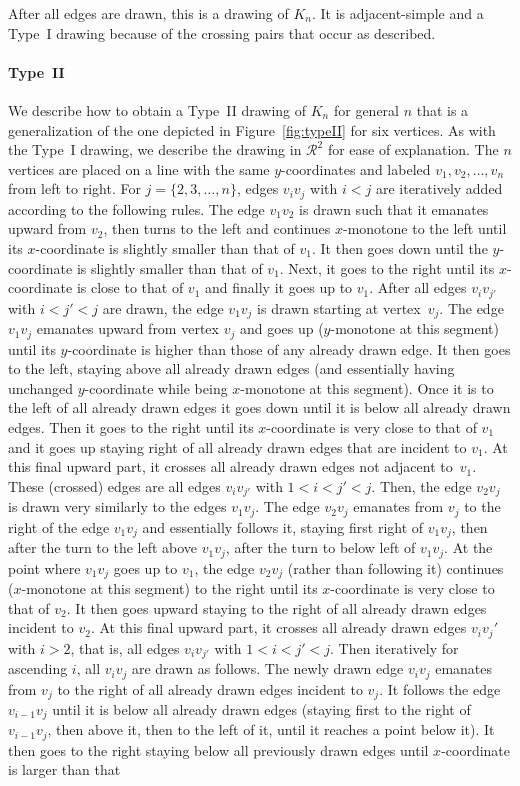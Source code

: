 \documentclass[a4paper,UKenglish,cleveref, autoref, thm-restate]{lipics_arxiv}
\begin{document}
   After all edges are drawn, this is a drawing of $K_n$. It is adjacent-simple and a Type~I drawing because of the crossing pairs that occur as described. 

\paragraph*{Type~II}
 We describe how to obtain a Type~II drawing of $K_n$ for general $n$ that is a generalization of the one depicted in Figure~\ref{fig:typeII} for six vertices. As with the Type~I drawing, we describe the drawing in $\mathcal{R}^2$ for ease of explanation. 
 The $n$ vertices are placed on a line with the same $y$-coordinates and labeled $v_1,v_2,\ldots,v_n$ from left to right.
 For $j=\{2,3,\ldots,n\}$, edges $v_iv_j$ with $i<j$ are iteratively added according to the following rules. The edge $v_1v_2$ is drawn such that it emanates upward from $v_2$, then turns to the left and continues $x$-monotone to the left until its $x$-coordinate is slightly smaller than that of $v_1$. It then goes down until the $y$-coordinate is slightly smaller than that of $v_1$. Next, it goes to the right until its $x$-coordinate is close to that of $v_1$ and finally it goes up to $v_1$.  After all edges $v_iv_{j'}$ with $i<j'<j$ are drawn, the edge $v_1v_j$ is drawn starting at vertex~$v_j$. The edge $v_1v_j$ emanates upward from vertex $v_j$ and goes up ($y$-monotone at this segment) until its $y$-coordinate is higher than those of any already drawn edge. It then goes to the left, staying above all already drawn edges (and essentially having unchanged $y$-coordinate while being $x$-monotone at this segment). Once it is to the left of all already drawn edges it goes down until it is below all already drawn edges. Then it goes to the right until its $x$-coordinate is very close to that of $v_1$ and it goes up staying right of all already drawn edges that are incident to $v_1$. At this final upward part, it crosses all already drawn edges not adjacent to~$v_1$. These (crossed) edges are all edges $v_iv_{j'}$ with $1<i<j'<j$. Then, the edge $v_2v_j$ is drawn very similarly to the edges $v_1v_j$. The edge $v_2v_j$ emanates from $v_j$ to the right of the edge $v_1v_j$ and essentially follows it, staying first right of $v_1v_j$, then after the turn to the left above $v_1v_j$, after the turn to below left of $v_1v_j$. At the point where $v_1v_j$ goes up to $v_1$, the edge $v_2v_j$ (rather than following it) continues ($x$-monotone at this segment) to the right until its $x$-coordinate is very close to that of $v_2$. It then goes upward staying to the right of all already drawn edges incident to $v_2$. At this final upward part, it crosses all already drawn edges $v_iv_j'$ with $i>2$, that is, all edges $v_iv_{j'}$ with $1<i<j'<j$. Then iteratively for ascending $i$, all $v_iv_j$ are drawn as follows. The newly drawn edge $v_iv_j$ emanates from $v_j$ to the right of all already drawn edges incident to $v_j$. It follows the edge $v_{i-1}v_j$ until it is below all already drawn edges (staying first to the right of $v_{i-1}v_j$, then above it, then to the left of it, until it reaches a point below it). It then goes to the right staying below all previously drawn edges until $x$-coordinate is larger than that 
\end{document}
